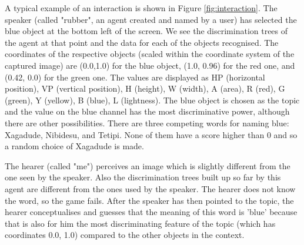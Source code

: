 A typical example of an interaction is shown in Figure \ref{fig:interaction}. 
The speaker (called "rubber", an agent created and named by a user) has selected the blue object at the bottom left 
of the screen. We see the discrimination trees of the agent at that point and the data for each of the objects 
recognised. The coordinates of the respective objects (scaled within the coordinate system of 
the captured image) are (0.0,1.0) for the blue object, (1.0, 0.96) for the red one, and (0.42, 0.0) for the green one. 
The values are displayed as HP (horizontal position), VP (vertical position), H (height), W (width), A (area), 
R (red), G (green), Y (yellow), B (blue), L (lightness). 
The blue object is chosen as the topic and the value on the blue channel has the most discriminative power, although 
there are other possibilities. There are three competing words for naming blue: Xagadude, Nibidesu, and Tetipi. 
None of them have a score higher than 0 and so a random choice of Xagadude is made. 

The hearer (called "me") perceives an image which is slightly different from 
the one seen by the speaker. Also the discrimination trees built up so far by this agent are different from the ones used
by the speaker. The hearer does not know the word, so the game fails. After the speaker has then pointed to the 
topic, the hearer conceptualises and guesses that the meaning of this word is 'blue' because that is also for him the most 
discriminating feature of the topic (which has coordinates 0.0, 1.0) compared to the other objects in the context. 

